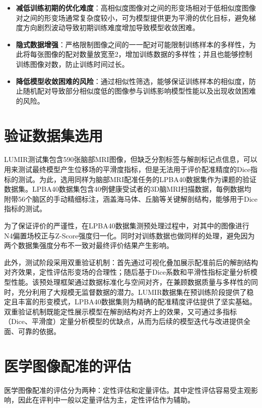 \begin{itemize}
    \item \textbf{减低训练初期的优化难度}：高相似度图像对之间的形变场相对于低相似度图像对之间的形变场通常复杂度较小，可为模型提供更为平滑的优化目标，避免梯度方向剧烈波动导致初期训练难度增加导致模型收敛困难。
    \item \textbf{隐式数据增强}：严格限制图像之间的一一配对可能限制训练样本的多样性，为此将每张图像的配对数量放宽至2，增加训练数据的多样性；并且也能够控制训练图像对数，防止训练时间过长。
    \item \textbf{降低模型收敛困难的风险}：通过相似性筛选，能够保证训练样本的相似度，防止随机配对导致部分相似度低的图像参与训练影响模型性能以及出现收敛困难的风险。
\end{itemize}

\section{验证数据集选用}

LUMIR测试集包含590张脑部MRI图像，但缺乏分割标签与解剖标记点信息，可以用来测试最终模型产生位移场的平滑度指标，但是无法用于评价配准精度的Dice指标的测试。为此，选用同样为脑部MRI配准任务的LPBA40数据集作为课题的验证数据集。LPBA40数据集包含40例健康受试者的3D脑MRI扫描数据，每例数据均附带56个脑区的手动精细标注，涵盖海马体、丘脑等关键解剖结构，能够用于Dice指标的测试。

为了保证评价的严谨性，在LPBA40数据集测预处理过程中，对其中的图像进行N4偏置场校正与Z-Score强度归一化。同时对训练数据也做同样的处理，避免因为两个数据集强度分布不一致对最终评价结果产生影响。

此外，测试阶段采用双重验证机制：首先通过可视化叠加展示配准前后的解剖结构对齐效果，定性评估形变场的合理性；随后基于Dice系数和平滑性指标定量分析模型性能。该预处理框架通过数据标准化与空间对齐，在兼顾数据质量与多样性的同时，充分利用了大规模无监督数据的潜力。LUMIR数据集在预训练阶段提供了稳定且丰富的形变模式，LPBA40数据集则为精确的配准精度评估提供了坚实基础。双重验证机制既能定性展示模型在解剖结构对齐上的效果，又可通过多指标（Dice、平滑度）定量分析模型的优缺点，从而为后续的模型迭代与改进提供全面、可靠的依据。

\section{医学图像配准的评估}

医学图像配准的评估分为两种：定性评估和定量评估。其中定性评估容易受主观影响，因此在评判中一般以定量评估为主，定性评估作为辅助。

